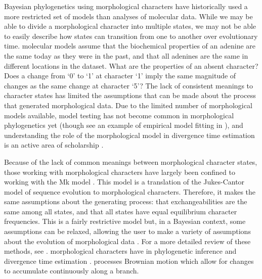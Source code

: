Bayesian phylogenetics using morphological characters have historically used a more restricted set of models than analyses of molecular data.
While we may be able to divide a  morphological character into multiple states, we may not be able to easily describe how states can transition from one to another over evolutionary time.
 molecular models assume that the biochemical properties of an adenine are the same today as they were in the past, and
that all adenines are the same in different locations in the dataset.
What are the properties of an absent  character?
Does a change from  `0' to `1' at character `1' imply the same magnitude of changes as the same change  at character `5'?
The lack of consistent meanings to character states has limited the assumptions that can be made about the process that generated morphological data.
Due to the limited number of morphological models available, model testing has not become common in morphological phylogenetics yet (though see an example of empirical model fitting in \cite*{bapst2017}), and understanding the role of the morphological model in divergence time estimation is an active area of scholarship \citep{Klopfstein2019}. 

Because of the lack of common meanings between morphological character states, those working with morphological characters have largely been confined to working with the Mk model \citep{Lewis2001} .
This model is a translation of the Jukes-Cantor model \citep{Jukes1969} of sequence evolution to morphological characters.
Therefore, it makes the same assumptions about the generating process: that exchangeabilities are the same among all  states, and that all states have equal equilibrium character frequencies.
This is a fairly restrictive model but, in a Bayesian context, some assumptions can be relaxed, allowing the user to make a variety of assumptions about the evolution of morphological data \citep{Nylander2004, Wright2016}.
For a more detailed review of these methods, see \citep{Wright2019}. 
 morphological characters have  in phylogenetic inference \citep{goloboff2006, parins2017} and divergence time estimation \citep{AlvarezC2019}.
 processes  Brownian motion  which allow for changes to accumulate continuously along a branch.

